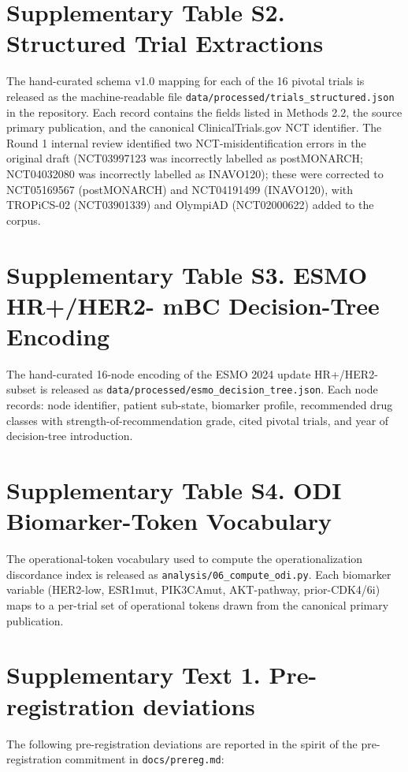 \documentclass[11pt,a4paper]{article}
\begin{document}
\section*{Supplementary Table S2. Structured Trial Extractions}

The hand-curated schema v1.0 mapping for each of the 16 pivotal trials is
released as the machine-readable file \texttt{data/processed/trials\_structured.json}
in the repository. Each record contains the fields listed in Methods 2.2,
the source primary publication, and the canonical ClinicalTrials.gov NCT
identifier. The Round 1 internal review identified two NCT-misidentification
errors in the original draft (NCT03997123 was incorrectly labelled as
postMONARCH; NCT04032080 was incorrectly labelled as INAVO120); these were
corrected to NCT05169567 (postMONARCH) and NCT04191499 (INAVO120), with TROPiCS-02
(NCT03901339) and OlympiAD (NCT02000622) added to the corpus.

\section*{Supplementary Table S3. ESMO HR+/HER2- mBC Decision-Tree Encoding}

The hand-curated 16-node encoding of the ESMO 2024 update HR+/HER2- subset
is released as \texttt{data/processed/esmo\_decision\_tree.json}. Each node
records: node identifier, patient sub-state, biomarker profile, recommended
drug classes with strength-of-recommendation grade, cited pivotal trials, and
year of decision-tree introduction.

\section*{Supplementary Table S4. ODI Biomarker-Token Vocabulary}

The operational-token vocabulary used to compute the operationalization
discordance index is released as \texttt{analysis/06\_compute\_odi.py}. Each
biomarker variable (HER2-low, ESR1mut, PIK3CAmut, AKT-pathway, prior-CDK4/6i)
maps to a per-trial set of operational tokens drawn from the canonical primary
publication.

\section*{Supplementary Text 1. Pre-registration deviations}

The following pre-registration deviations are reported in the spirit of the
pre-registration commitment in \texttt{docs/prereg.md}:
\end{document}
